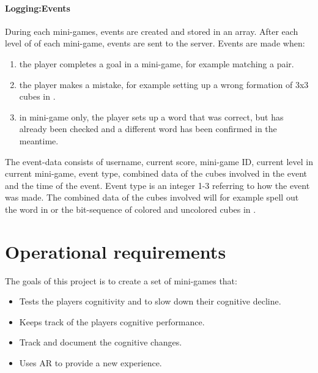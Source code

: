\paragraph{Logging:Events}
During each mini-games, events are created and stored in an array. After each level of of each mini-game, events are sent to the server.
Events are made when:
\begin{enumerate}
	\item the player completes a goal in a mini-game, for example matching a pair.
	\item the player makes a mistake, for example setting up a wrong formation of 3x3 cubes in .
	\item in  mini-game only, the player sets up a word that was correct, but has already been checked and a different word has been confirmed in the meantime.
\end{enumerate}
The event-data consists of username, current score, mini-game ID, current level in current mini-game, event type, combined data of the cubes involved in the event and the time of the event. Event type is an integer 1-3 referring to how the event was made. The combined data of the cubes involved will for example spell out the word in  or the bit-sequence of colored and uncolored cubes in .\\

\section{Operational requirements}
The goals of this project is to create a set of mini-games that:
\begin{itemize}
	\item Tests the players cognitivity and to slow down their cognitive decline.
	\item Keeps track of the players cognitive performance.
	\item Track and document the cognitive changes.
	\item Uses AR to provide a new experience.
\end{itemize}

